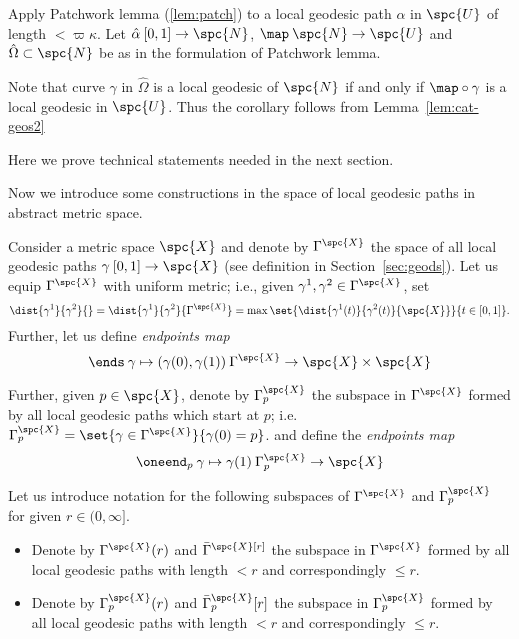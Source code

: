 Apply Patchwork lemma (\ref{lem:patch}) to a local geodesic path $\alpha$ in $\spc{U}$ of length $<\varpi\kappa$.
Let  
$\hat\alpha\:[0,1]\to\spc{N}$, 
$\map\:\spc{N}\to\spc{U}$
and $\hat\Omega\subset\spc{N}$
be as in the formulation of Patchwork lemma.

Note that curve $\gamma$ in $\hat\Omega$ is a local geodesic of $\spc{N}$ if and only if $\map\circ\gamma$ is a local geodesic in $\spc{U}$.
Thus the corollary follows from Lemma~\ref{lem:cat-geos2}
\qeds


















Here we prove technical statements needed in the next section. 

Now we introduce some constructions in the space of local geodesic paths in abstract metric space.

Consider a metric space $\spc{X}$ 
and denote by $\Gamma^\spc{X}$ 
the space of all local geodesic  paths $\gamma\:[0,1]\to\spc{X}$ 
(see definition in Section~\ref{sec:geods}).
Let us equip $\Gamma^\spc{X}$ with uniform metric;
i.e., given $\gamma^1,\gamma^2\in \Gamma^\spc{X}$,
set 
$$\dist{\gamma^1}{\gamma^2}{}
=
\dist{\gamma^1}{\gamma^2}{\Gamma^\spc{X}}
=
\max\set{\dist{\gamma^1(t)}{\gamma^2(t)}{\spc{X}}}{t\in [0,1]}.$$
Further, let us define 
\emph{endpoints map}%
$$
\ends\:\gamma\mapsto (\gamma(0),\gamma(1))\:\Gamma^\spc{X}\to\spc{X}\times\spc{X}
$$

Further, given  $p\in\spc{X}$,
denote by $\Gamma_p^\spc{X}$ the subspace in $\Gamma^\spc{X}$ formed by all local geodesic paths which start at $p$; 
i.e. 
$\Gamma^\spc{X}_p=\set{\gamma\in\Gamma^\spc{X}}{\gamma(0)=p}$.
and define the 
\emph{endpoints map}%
$$
\oneend_p\:\gamma\mapsto \gamma(1)\:\Gamma^\spc{X}_p\to\spc{X}
$$


Let us introduce notation for the following subspaces of $\Gamma^\spc{X}$ and $\Gamma^\spc{X}_p$
for given $r\in(0,\infty]$.

\begin{itemize}
\item Denote by $\Gamma^\spc{X}(r)$ 
and $\bar\Gamma^\spc{X}[r]$ 
the subspace in $\Gamma^\spc{X}$ formed by all local geodesic paths with length $<r$ and correspondingly $\le r$.

\item Denote by 
$\Gamma^\spc{X}_p(r)$ 
and 
$\bar\Gamma^\spc{X}_p[r]$
the subspace in $\Gamma^\spc{X}_p$ formed by all local geodesic paths with length $<r$ and correspondingly $\le r$.
\end{itemize}

